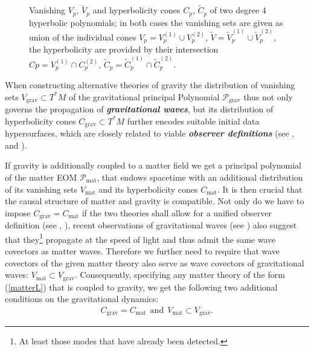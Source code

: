 \documentclass[%
preprint,
nofootinbib,
amsmath,amssymb,
aps,
prd,
floatfix,
]{revtex4-2}
\newcommand{\coneback}[4][]{
  \draw[canvas is xy plane at z=#2, #1] (45-#4:#3) arc (45-#4:225+#4:#3) -- (O) --cycle;
  }
\newcommand{\conefront}[4][]{
  \draw[canvas is xy plane at z=#2, #1] (45-#4:#3) arc (45-#4:-135+#4:#3) -- (O) --cycle;
  }
\begin{document}
\begin{figure}
\begin{minipage}{0.2\textwidth}
\begin{center}
\end{center}
\end{minipage}
    \caption{Vanishing $V_p$, $\widetilde{V}_p$ and hyperbolicity cones $C_p$, $\widetilde{C}_p$ of two degree $4$ hyperbolic polynomials; in both cases the vanishing sets are given as union of the individual cones $V_p = V_p^{(1)} \cup V_p^{(2)}$, $\widetilde{V} = \widetilde{V}_p^{(1)} \cup \widetilde{V}_p^{(2)}$, the hyperbolicity are provided by their intersection $Cp = V_p^{(1)} \cap C_p^{(2)}$,  $\widetilde{C}_p = \widetilde{C}_p^{(1)} \cap \widetilde{C}_p^{(2)}$.}
    \label{Poly}
\end{figure}

When constructing alternative theories of gravity the distribution of vanishing sets $V_{\text{grav}} \subset T^{\ast}M$ of the gravitational principal Polynomial $\mathcal{P}_{\text{grav}}$ thus not only governs the propagation of \textit{\textbf{gravitational waves}}, but its  distribution of hyperbolicity cones $C_{\text{grav}}\subset T^{\ast}M$ further encodes suitable initial data hypersurfaces, which are closely related to viable \textit{\textbf{observer definitions}} (see \cite{2018PhRvD..97h4036D}, \cite{2011PhRvD..83d4047R} and \cite{Rivera}). 

If gravity is additionally coupled to a matter field we get a principal polynomial of the matter EOM $\mathcal{P}_{\text{mat}}$, that endows spacetime with an additional distribution of its vanishing sets $V_{\text{mat}}$ and its hyperbolicity cones $C_{\text{mat}}$. It is then crucial that the causal structure of matter and gravity is compatible. 
Not only do we have to impose $C_{\text{grav}} = C_{\text{mat}}$ if the two theories shall allow for a unified observer definition (see \cite{Rivera}, \cite{2011PhRvD..83d4047R}), recent observations of gravitational waves (see \cite{2017ApJ...848L..13A}) also suggest that they\footnote{At least those modes that have already been detected.} propagate at the speed of light and thus admit the same wave covectors as matter waves.
Therefore we further need to require that wave covectors of the given matter theory also serve as wave covectors of gravitational waves: $V_{\text{mat}} \subset V_{\text{grav}}$.
Consequently, specifying any matter theory of the form (\ref{matterL}) that is coupled to gravity, we get the following two additional conditions on the gravitational dynamics:
\begin{align}\label{A2}
    C_{\text{grav}} = C_{\text{mat}} \ \ \text{and} \ \ V_{\text{mat}} \subset V_{\text{grav}}.\tag{Axiom 2}
\end{align}
\end{document}
